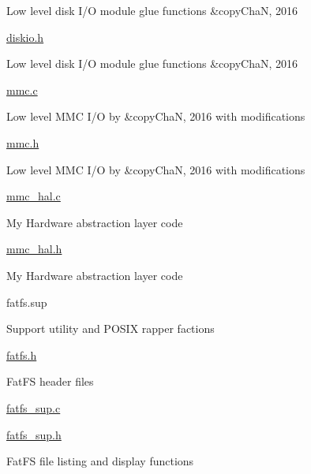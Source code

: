 \begin{DoxyItemize}
\begin{DoxyItemize}
\begin{DoxyItemize}
\item Low level disk I/O module glue functions \&copy\+ChaN, 2016
\end{DoxyItemize}
\item \hyperlink{diskio_8h}{diskio.\+h}
\begin{DoxyItemize}
\item Low level disk I/O module glue functions \&copy\+ChaN, 2016
\end{DoxyItemize}
\item \hyperlink{mmc_8c}{mmc.\+c}
\begin{DoxyItemize}
\item Low level M\+MC I/O by \&copy\+ChaN, 2016 with modifications
\end{DoxyItemize}
\item \hyperlink{mmc_8h}{mmc.\+h}
\begin{DoxyItemize}
\item Low level M\+MC I/O by \&copy\+ChaN, 2016 with modifications
\end{DoxyItemize}
\item \hyperlink{mmc__hal_8c}{mmc\+\_\+hal.\+c}
\begin{DoxyItemize}
\item My Hardware abstraction layer code
\end{DoxyItemize}
\item \hyperlink{mmc__hal_8h}{mmc\+\_\+hal.\+h}
\begin{DoxyItemize}
\item My Hardware abstraction layer code
\end{DoxyItemize}
\end{DoxyItemize}
\item fatfs.\+sup
\begin{DoxyItemize}
\item Support utility and P\+O\+S\+IX rapper factions
\item \hyperlink{fatfs_8h}{fatfs.\+h}
\begin{DoxyItemize}
\item Fat\+FS header files
\end{DoxyItemize}
\item \hyperlink{fatfs__sup_8c}{fatfs\+\_\+sup.\+c}
\item \hyperlink{fatfs__sup_8h}{fatfs\+\_\+sup.\+h}
\begin{DoxyItemize}
\item Fat\+FS file listing and display functions
\end{DoxyItemize}

\end{DoxyItemize}
\end{DoxyItemize}
